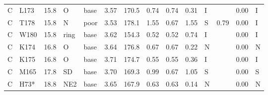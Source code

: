 {\begin{longtable}{llrllrrrrrlrrl}
C & L173 & 15.8 & O & base & 3.57 & 170.5 & 0.74 & 0.74 & 0.31 & I &  & 0.00 & I\\
C & T178 & 15.8 & N & poor & 3.53 & 178.1 & 1.55 & 0.67 & 1.55 & S & 0.79 & 0.00 & I\\
C & W180 & 15.8 & ring & base & 3.62 & 154.3 & 0.52 & 0.52 & 0.74 & I &  & 0.00 & I\\
C & K174 & 16.8 & O & base & 3.64 & 176.8 & 0.67 & 0.67 & 0.22 & N &  & 0.00 & N\\
C & K175 & 16.8 & O & base & 3.71 & 174.7 & 0.55 & 0.55 & 0.36 & I &  & 0.00 & I\\
C & M165 & 17.8 & SD & base & 3.70 & 169.3 & 0.99 & 0.67 & 1.05 & S &  & 0.00 & S\\
C & H73* & 18.8 & NE2 & base & 3.65 & 167.9 & 0.63 & 0.63 & 0.14 & N &  & 0.00 & N\\
\end{longtable}}
